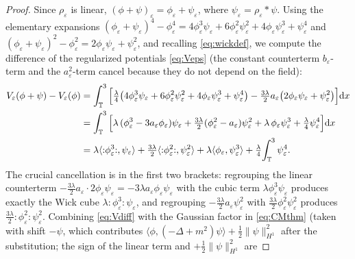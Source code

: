 \documentclass[12pt]{article}
\theoremstyle{definition}
\newcommand{\T}{\mathbb{T}^3}
\newcommand{\dd}{\mathrm{d}}
\newcommand{\Wick}[1]{{:}#1{:}}
\begin{document}
\begin{proof}
Since $\rho_\varepsilon$ is linear, $(\phi+\psi)_\varepsilon=\phi_\varepsilon+\psi_\varepsilon$,
where $\psi_\varepsilon=\rho_\varepsilon*\psi$. Using the elementary expansions
$(\phi_\varepsilon+\psi_\varepsilon)^4-\phi_\varepsilon^4
=4\phi_\varepsilon^3\psi_\varepsilon+6\phi_\varepsilon^2\psi_\varepsilon^2+4\phi_\varepsilon\psi_\varepsilon^3+\psi_\varepsilon^4$
and
$(\phi_\varepsilon+\psi_\varepsilon)^2-\phi_\varepsilon^2
=2\phi_\varepsilon\psi_\varepsilon+\psi_\varepsilon^2$, and recalling
\eqref{eq:wickdef}, we compute the difference of the regularized potentials
\eqref{eq:Veps} (the constant counterterm $b_\varepsilon$-term and the $a_\varepsilon^2$-term cancel
because they do not depend on the field):
\begin{align}
  V_\varepsilon(\phi+\psi)-V_\varepsilon(\phi)
  &=\int_\T\Big[\tfrac\lambda4\big(4\phi_\varepsilon^3\psi_\varepsilon
        +6\phi_\varepsilon^2\psi_\varepsilon^2+4\phi_\varepsilon\psi_\varepsilon^3+\psi_\varepsilon^4\big)
     -\tfrac{3\lambda}{2}a_\varepsilon\big(2\phi_\varepsilon\psi_\varepsilon+\psi_\varepsilon^2\big)\Big]\dd x
   \notag\\
  &=\int_\T\Big[\lambda\,(\phi_\varepsilon^3-3a_\varepsilon\phi_\varepsilon)\psi_\varepsilon
        +\tfrac{3\lambda}{2}(\phi_\varepsilon^2-a_\varepsilon)\psi_\varepsilon^2
        +\lambda\,\phi_\varepsilon\psi_\varepsilon^3+\tfrac\lambda4\psi_\varepsilon^4\Big]\dd x
   \notag\\
  &=\lambda\langle\Wick{\phi_\varepsilon^3},\psi_\varepsilon\rangle
     +\tfrac{3\lambda}{2}\langle\Wick{\phi_\varepsilon^2},\psi_\varepsilon^2\rangle
     +\lambda\langle\phi_\varepsilon,\psi_\varepsilon^3\rangle
     +\tfrac\lambda4\!\int_\T\psi_\varepsilon^4 .
  \label{eq:Vdiff}
\end{align}
The crucial cancellation is in the first two brackets: regrouping the linear
counterterm $-\tfrac{3\lambda}{2}a_\varepsilon\cdot2\phi_\varepsilon\psi_\varepsilon
=-3\lambda a_\varepsilon\phi_\varepsilon\psi_\varepsilon$ with the cubic term
$\lambda\phi_\varepsilon^3\psi_\varepsilon$ produces exactly the Wick cube
$\lambda\Wick{\phi_\varepsilon^3}\psi_\varepsilon$, and regrouping
$-\tfrac{3\lambda}{2}a_\varepsilon\psi_\varepsilon^2$ with
$\tfrac{3\lambda}{2}\phi_\varepsilon^2\psi_\varepsilon^2$ produces
$\tfrac{3\lambda}{2}\Wick{\phi_\varepsilon^2}\psi_\varepsilon^2$. Combining
\eqref{eq:Vdiff} with the Gaussian factor in \eqref{eq:CMthm} (taken with shift
$-\psi$, which contributes $\langle\phi,(-\Delta+m^2)\psi\rangle+\tfrac12\|\psi\|_{H^1}^2$
after the substitution; the sign of the linear term and $+\tfrac12\|\psi\|^2_{H^1}$ are

\end{proof}
\end{document}
